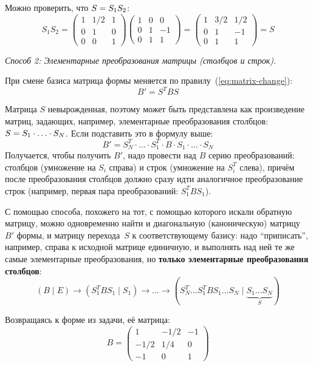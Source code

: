 \documentclass[a4paper,12pt]{article}
\begin{document}
\begin{solution}
    Можно проверить, что $S \hm= S_1 S_2$:
    \[
      S_1 S_2 = \begin{pmatrix}
        1 & 1/2 & 1\\
        0 & 1 & 0\\
        0 & 0 & 1
      \end{pmatrix} \begin{pmatrix}
        1 & 0 & 0\\
        0 & 1 & -1\\
        0 & 1 & 1
      \end{pmatrix} = \begin{pmatrix}
        1 & 3/2 & 1/2\\
        0 & 1 & -1\\
        0 & 1 & 1
      \end{pmatrix} = S
    \]
    
    \bigskip
    
    \emph{Способ 2: Элементарные преобразования матрицы (столбцов и строк)}.
    
    При смене базиса матрица формы меняется по правилу~(\ref{eq:matrix-change}):
    \[
      B' = S^T B S
    \]
    
    Матрица $S$ невырожденная, поэтому может быть представлена как произведение матриц, задающих, например, элементарные преобразования столбцов: $S \hm= S_1 \hm\cdot \ldots \hm\cdot S_N$.
    Если подставить это в формулу выше:
    \[
      B' = S_N^T \cdot \ldots \cdot S_1^T \cdot B \cdot S_1 \cdot \ldots \cdot S_N
    \]
    Получается, чтобы получить $B'$, надо провести над $B$ серию преобразований: столбцов (умножение на $S_i$ справа) и строк (умножение на $S_i^T$ слева), причём после преобразования столбцов должно сразу идти аналогичное преобразование строк (например, первая пара преобразований: $S_1^T B S_1$).
    
    С помощью способа, похожего на тот, с помощью которого искали обратную матрицу, можно одновременно найти и диагональную (каноническую) матрицу~$B'$ формы, и матрицу перехода~$S$ к соответствующему базису: надо ``приписать'', например, справа к исходной матрице единичную, и выполнять над ней те же самые элементарные преобразования, но \textbf{только элементарные преобразования столбцов}:
    \[
      (B \mid E) \to (S_1^T B S_1 \mid S_1) \to \ldots \to (S_N^T \ldots S_1^T B S_1 \ldots S_N \mid \underbrace{S_1 \ldots S_N}_{S})
    \]
    
    Возвращаясь к форме из задачи, её матрица:
    \[
      B = \begin{pmatrix}
        1    & -1/2 & -1\\
        -1/2 & 1/4  & 0\\
        -1   & 0    & 1
      \end{pmatrix}
    \]
    

\end{solution}
\end{document}

